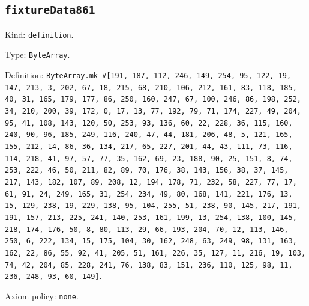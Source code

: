 \documentclass[11pt]{article}
\begin{document}
\subsection*{\texttt{fixtureData861}}
\noindent Kind: \texttt{definition}.\par
\noindent Type: \texttt{ByteArray}.\par
\noindent Definition: \texttt{ByteArray.mk \#[191, 187, 112, 246, 149, 254, 95, 122, 19, 147, 213, 3, 202, 67, 18, 215, 68, 210, 106, 212, 161, 83, 118, 185, 40, 31, 165, 179, 177, 86, 250, 160, 247, 67, 100, 246, 86, 198, 252, 34, 210, 200, 39, 172, 0, 17, 13, 77, 192, 79, 71, 174, 227, 49, 204, 95, 41, 108, 143, 120, 50, 253, 93, 136, 60, 22, 228, 36, 115, 160, 240, 90, 96, 185, 249, 116, 240, 47, 44, 181, 206, 48, 5, 121, 165, 155, 212, 14, 86, 36, 134, 217, 65, 227, 201, 44, 43, 111, 73, 116, 114, 218, 41, 97, 57, 77, 35, 162, 69, 23, 188, 90, 25, 151, 8, 74, 253, 222, 46, 50, 211, 82, 89, 70, 176, 38, 143, 156, 38, 37, 145, 217, 143, 182, 107, 89, 208, 12, 194, 178, 71, 232, 58, 227, 77, 17, 61, 91, 24, 249, 165, 31, 254, 234, 49, 80, 168, 141, 221, 176, 13, 15, 129, 238, 19, 229, 138, 95, 104, 255, 51, 238, 90, 145, 217, 191, 191, 157, 213, 225, 241, 140, 253, 161, 199, 13, 254, 138, 100, 145, 218, 174, 176, 50, 8, 80, 113, 29, 66, 193, 204, 70, 12, 113, 146, 250, 6, 222, 134, 15, 175, 104, 30, 162, 248, 63, 249, 98, 131, 163, 162, 22, 86, 55, 92, 41, 205, 51, 161, 226, 35, 127, 11, 216, 19, 103, 74, 42, 204, 85, 228, 241, 76, 138, 83, 151, 236, 110, 125, 98, 11, 236, 248, 93, 60, 149]}.\par
\noindent Axiom policy: \texttt{none}.\par
\end{document}
